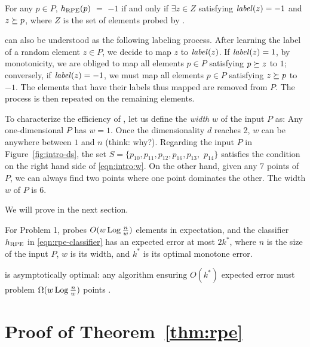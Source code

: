 \begin{proposition} \label{prop:rpe:basic}
    For any $p \in P$, $h_{\mathrm{RPE}}(p)$ $=$ $-1$ if and only if $\exists z \in Z$ satisfying $\mathit{label}(z) = -1$ and $z \succeq p$, where $Z$ is the set of elements probed by .
\end{proposition}


 can also be understood as the following labeling process. After learning the label of a random element $z \in P$, we decide to map $z$ to $\mathit{label}(z)$. If $\mathit{label}(z) = 1$, by monotonicity, we are obliged to map all elements $p \in P$ satisfying $p \succeq z$ to $1$; conversely, if $\mathit{label}(z) = -1$, we must map all elements $p \in P$ satisfying $z \succeq p$ to $-1$. The elements that have their labels thus mapped are removed from $P$. The process is then repeated on the remaining elements.

\vgap

To characterize the efficiency of , let us define the {\em width} $w$ of the input $P$ as:
Any one-dimensional $P$ has $w = 1$. Once the dimensionality $d$ reaches 2, $w$ can be anywhere between $1$ and $n$ (think: why?). Regarding the input $P$ in Figure~\ref{fig:intro-ds}, the set $S = \{p_{10}, p_{11}, p_{12}, p_{16}, p_{13},$ $p_{14}\}$ satisfies the condition on the right hand side of \eqref{eqn:intro:w}. On the other hand, given any 7 points of $P$, we can always find two points where one point dominates the other. The width $w$ of $P$ is 6.

\vgap

We will prove in the next section.

\begin{theorem} \label{thm:rpe}
    For Problem 1,  probes $O(w \operatorname*{Log} \frac{n}{w})$ elements in expectation, and the classifier $h_{\mathrm{RPE}}$ in \eqref{eqn:rpe-classifier} has an expected error at most $2 k^*$, where $n$ is the size of the input $P$, $w$ is its width, and $k^*$ is its optimal monotone error.
\end{theorem}

 is asymptotically optimal: any algorithm ensuring $O(k^*)$ expected error must problem $\Omega(w \operatorname*{Log} \frac{n}{w})$ points \cite{t18}.

\section{Proof of Theorem~\ref{thm:rpe}} \label{sec:rpe}


